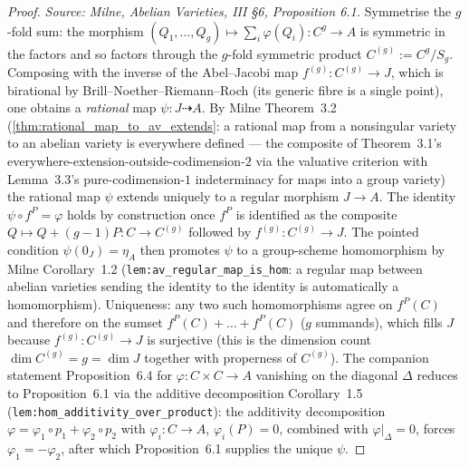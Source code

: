 \begin{proof}
  \textit{Source: Milne, Abelian Varieties, III \S 6, Proposition 6.1.}
  Symmetrise the \(g\)-fold sum: the morphism \((Q_1, \dots, Q_g) \mapsto \sum_i \varphi(Q_i) \colon C^g \to A\) is symmetric in the factors and so factors through the \(g\)-fold symmetric product \(C^{(g)} := C^g / S_g\). Composing with the inverse of the Abel--Jacobi map \(f^{(g)} \colon C^{(g)} \to J\), which is birational by Brill--Noether--Riemann--Roch (its generic fibre is a single point), one obtains a \emph{rational} map \(\psi \colon J \dashrightarrow A\). By Milne Theorem~3.2 (\cref{thm:rational_map_to_av_extends}: a rational map from a nonsingular variety to an abelian variety is everywhere defined --- the composite of Theorem~3.1's everywhere-extension-outside-codimension-\(2\) via the valuative criterion with Lemma~3.3's pure-codimension-\(1\) indeterminacy for maps into a group variety) the rational map \(\psi\) extends uniquely to a regular morphism \(J \to A\). The identity \(\psi \circ f^P = \varphi\) holds by construction once \(f^P\) is identified as the composite \(Q \mapsto Q + (g - 1)P \colon C \to C^{(g)}\) followed by \(f^{(g)} \colon C^{(g)} \to J\). The pointed condition \(\psi(0_J) = \eta_A\) then promotes \(\psi\) to a group-scheme homomorphism by Milne Corollary~1.2 (\texttt{lem:av_regular_map_is_hom}: a regular map between abelian varieties sending the identity to the identity is automatically a homomorphism). Uniqueness: any two such homomorphisms agree on \(f^P(C)\) and therefore on the sumset \(f^P(C) + \dots + f^P(C)\) (\(g\) summands), which fills \(J\) because \(f^{(g)} \colon C^{(g)} \to J\) is surjective (this is the dimension count \(\dim C^{(g)} = g = \dim J\) together with properness of \(C^{(g)}\)). The companion statement Proposition~6.4 for \(\varphi \colon C \times C \to A\) vanishing on the diagonal \(\Delta\) reduces to Proposition~6.1 via the additive decomposition Corollary~1.5 (\texttt{lem:hom_additivity_over_product}): the additivity decomposition \(\varphi = \varphi_1 \circ p_1 + \varphi_2 \circ p_2\) with \(\varphi_i \colon C \to A\), \(\varphi_i(P) = 0\), combined with \(\varphi|_\Delta = 0\), forces \(\varphi_1 = -\varphi_2\), after which Proposition~6.1 supplies the unique \(\psi\).

\end{proof}
